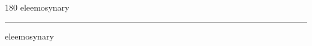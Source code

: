 
\begin{frame}
\begin{center}
\begin{turn}{180}
{\fontsize{2.5cm}{1em}\selectfont eleemosynary}
\end{turn}
\vspace{1em}\par  
\hrule
\vspace{1em}\par  
{\fontsize{2.5cm}{1em}\selectfont eleemosynary}
\end{center}
\end{frame}

